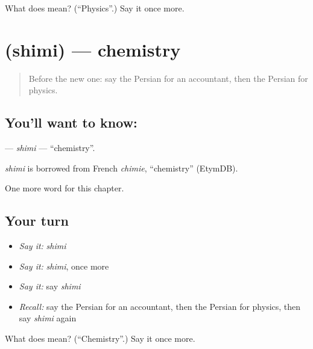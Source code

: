 \begin{tcolorbox}[breakable,colback=teal!4,colframe=teal!35!black,title={Before you move on}]
What does  mean? (\textquotedblleft{}Physics\textquotedblright{}.) Say it once more.
\end{tcolorbox}
\section[\texorpdfstring{\fa{شیمی} (shimi)}{شیمی (shimi)}]{ (shimi) — chemistry}

\label{lesson:FA-C285-shimi}



\begin{quote}
Before the new one: say the Persian for an accountant, then the Persian for physics.
\end{quote}

\subsection*{You'll want to know: }
\textbf{} — \emph{shimi} — \textquotedblleft{}chemistry\textquotedblright{}.

\begin{cousinweb}
\emph{shimi} is borrowed from French \emph{chimie}, \textquotedblleft{}chemistry\textquotedblright{} (EtymDB).
\end{cousinweb}

\begin{grammarlens}[title={What you've built}]
One more word for this chapter.
\end{grammarlens}

\subsection*{Your turn}
\begin{itemize}
\raggedright
  \item \emph{Say it:} \emph{shimi}
  \item \emph{Say it:} \emph{shimi}, once more
  \item \emph{Say it:} say \emph{shimi}
  \item \emph{Recall:} say the Persian for an accountant, then the Persian for physics, then say \emph{shimi} again
\end{itemize}

\begin{tcolorbox}[breakable,colback=teal!4,colframe=teal!35!black,title={Before you move on}]
What does  mean? (\textquotedblleft{}Chemistry\textquotedblright{}.) Say it once more.
\end{tcolorbox}
